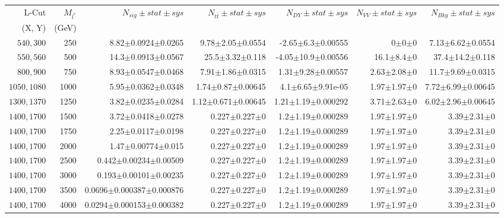 \documentclass[]{article}
\begin{document}
\begin{table}
\begin{center}
\scriptsize{
\begin{tabular}{ |r|r|r|r|r|r|r|}
\hline 
L-Cut & $M_{l^*}$ & $N_{sig}\pm stat \pm sys $ &$N_{t\bar{t}}\pm stat \pm sys $ & $N_{DY}\pm stat \pm sys $ & $N_{VV}\pm stat \pm sys $ &$N_{Bkg}\pm stat \pm sys$\\
(X, Y) & (GeV) & && &&\\
\hline 
$540, 300$ & 250 & 8.82$\pm$0.0924$\pm$0.0265 & 9.78$\pm$2.05$\pm$0.0554 & -2.65$\pm$6.3$\pm$0.00555 & 0$\pm$0$\pm$0 & 7.13$\pm$6.62$\pm$0.0554 \\
$550, 560$ & 500 & 14.3$\pm$0.0913$\pm$0.0567 & 25.5$\pm$3.32$\pm$0.118 & -4.05$\pm$10.9$\pm$0.00556 & 16.1$\pm$8.4$\pm$0 & 37.4$\pm$14.2$\pm$0.118 \\
$800, 900$ & 750 & 8.93$\pm$0.0547$\pm$0.0468 & 7.91$\pm$1.86$\pm$0.0315 & 1.31$\pm$9.28$\pm$0.00557 & 2.63$\pm$2.08$\pm$0 & 11.7$\pm$9.69$\pm$0.0315 \\
$1050, 1080$ & 1000 & 5.95$\pm$0.0362$\pm$0.0348 & 1.74$\pm$0.87$\pm$0.00645 & 4.1$\pm$6.65$\pm$9.91e-05 & 1.97$\pm$1.97$\pm$0 & 7.72$\pm$6.99$\pm$0.00645 \\
$1300, 1370$ & 1250 & 3.82$\pm$0.0235$\pm$0.0284 & 1.12$\pm$0.671$\pm$0.00645 & 1.21$\pm$1.19$\pm$0.000292 & 3.71$\pm$2.63$\pm$0 & 6.02$\pm$2.96$\pm$0.00645 \\
$1400, 1700$ & 1500 & 3.72$\pm$0.0418$\pm$0.0278 & 0.227$\pm$0.227$\pm$0 & 1.2$\pm$1.19$\pm$0.000289 & 1.97$\pm$1.97$\pm$0 & 3.39$\pm$2.31$\pm$0 \\
$1400, 1700$ & 1750 & 2.25$\pm$0.0117$\pm$0.0198 & 0.227$\pm$0.227$\pm$0 & 1.2$\pm$1.19$\pm$0.000289 & 1.97$\pm$1.97$\pm$0 & 3.39$\pm$2.31$\pm$0 \\
$1400, 1700$ & 2000 & 1.47$\pm$0.00774$\pm$0.015 & 0.227$\pm$0.227$\pm$0 & 1.2$\pm$1.19$\pm$0.000289 & 1.97$\pm$1.97$\pm$0 & 3.39$\pm$2.31$\pm$0 \\
$1400, 1700$ & 2500 & 0.442$\pm$0.00234$\pm$0.00509 & 0.227$\pm$0.227$\pm$0 & 1.2$\pm$1.19$\pm$0.000289 & 1.97$\pm$1.97$\pm$0 & 3.39$\pm$2.31$\pm$0 \\
$1400, 1700$ & 3000 & 0.193$\pm$0.00101$\pm$0.00235 & 0.227$\pm$0.227$\pm$0 & 1.2$\pm$1.19$\pm$0.000289 & 1.97$\pm$1.97$\pm$0 & 3.39$\pm$2.31$\pm$0 \\
$1400, 1700$ & 3500 & 0.0696$\pm$0.000387$\pm$0.000876 & 0.227$\pm$0.227$\pm$0 & 1.2$\pm$1.19$\pm$0.000289 & 1.97$\pm$1.97$\pm$0 & 3.39$\pm$2.31$\pm$0 \\
$1400, 1700$ & 4000 & 0.0294$\pm$0.000153$\pm$0.000382 & 0.227$\pm$0.227$\pm$0 & 1.2$\pm$1.19$\pm$0.000289 & 1.97$\pm$1.97$\pm$0 & 3.39$\pm$2.31$\pm$0 \\

\end{tabular}}
\end{center}
\end{table}
\end{document}
